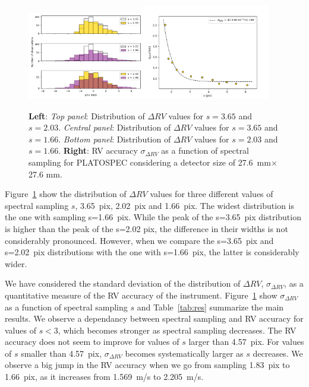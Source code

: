 \documentclass{article}
\begin{document}
\begin{figure}
    \centering
    \includegraphics[width=0.455\textwidth]{sampling_vs_accuracy.png}\includegraphics[width=0.5\textwidth]{sampling_vs_rvdiff.png}
    \caption{\textbf{Left}: \textit{Top panel}: Distribution of $\Delta RV$ values for $s = 3.65$ and $s = 2.03$. \textit{Central panel}: Distribution of $\Delta RV$ values for $s = 3.65$ and $s = 1.66$. \textit{Bottom panel}: Distribution of $\Delta RV$ values for $s = 2.03$ and $s = 1.66$. \textbf{Right}: RV accuracy $\sigma_{\Delta RV}$ as a function of spectral sampling for PLATOSPEC considering a detector size of 27.6~mm$\times$27.6
    mm.}
    \label{fig:drv_histo}
\end{figure}

Figure~\ref{fig:drv_histo} show the distribution of $\Delta RV$ values for three different values of spectral sampling $s$, 3.65~pix, 2.02~pix and 1.66~pix. The widest distribution is the one with sampling s=1.66~pix. While the peak of the s=3.65~pix distribution is higher than the peak of the s=2.02 pix, the difference in their widths is not considerably pronounced. However, when we compare the s=3.65~pix and s=2.02~pix distributions with the one with s=1.66~pix, the latter is considerably wider. 

We have considered the standard deviation of the distribution of $\Delta RV$, $\sigma_{\Delta RV}$, as a quantitative measure of the RV accuracy of the instrument. Figure~\ref{fig:drv_histo} show $\sigma_{\Delta RV}$ as a function of spectral sampling $s$ and Table~\ref{tab:res} summarize the main results. We observe a dependancy between spectral sampling and RV accuracy for values of $s<3$, which becomes stronger as spectral sampling decreases.  The RV accuracy does not seem to improve for values of $s$ larger than 4.57~pix. For values of $s$ smaller than 4.57~pix, $\sigma_{\Delta RV}$ becomes systematically larger as $s$ decreases. We observe a big jump in the RV accuracy when we go from sampling 1.83~pix to 1.66~pix, as it increases from 1.569~m/s to 2.205~m/s.
\end{document}
